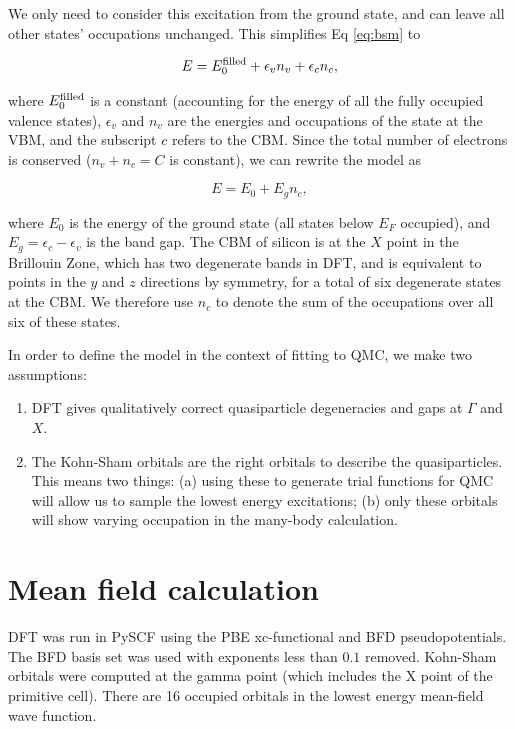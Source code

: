 We only need to consider this excitation from the ground state, and can leave all other states' occupations unchanged.
This simplifies Eq \ref{eq:bsm} to

\begin{equation}
E = E_0^{\rm filled} + \epsilon_v n_v + \epsilon_c n_c,
\end{equation}

where $E_0^{\rm filled}$ is a constant (accounting for the energy of all the fully occupied valence states), $\epsilon_v$ and $n_v$ are the energies and occupations of the state at the VBM, and the subscript $c$ refers to the CBM.
Since the total number of electrons is conserved ($n_v + n_c = C$ is constant), we can rewrite the model as

\begin{equation}\label{eq:bandgapmodel}
E = E_0 + E_g n_c,
\end{equation}

where $E_0$ is the energy of the ground state (all states below $E_F$ occupied), and $E_g = \epsilon_c - \epsilon_v$ is the band gap.
The CBM of silicon is at the $X$ point in the Brillouin Zone, which has two degenerate bands in DFT, and is equivalent to points in the $y$ and $z$ directions by symmetry, for a total of six degenerate states at the CBM.
We therefore use $n_c$ to denote the sum of the occupations over all six of these states.

In order to define the model in the context of fitting to QMC, we make two assumptions:

\begin{enumerate}
\item DFT gives qualitatively correct quasiparticle degeneracies and gaps at $\Gamma$ and $X$.
\item The Kohn-Sham orbitals are the right orbitals to describe the quasiparticles.
This means two things: 
(a) using these to generate trial functions for QMC will allow us to sample the lowest energy excitations; 
(b) only these orbitals will show varying occupation in the many-body calculation.
\end{enumerate}

\section{Mean field calculation}

DFT was run in PySCF using the PBE xc-functional and BFD pseudopotentials.
The BFD basis set was used with exponents less than $0.1$ removed.
Kohn-Sham orbitals were computed at the gamma point (which includes the X point of the primitive cell).
There are 16 occupied orbitals in the lowest energy mean-field wave function.


